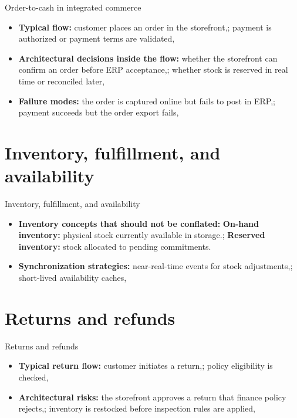\documentclass[aspectratio=169]{beamer}
\begin{document}
\begin{frame}{Order-to-cash in integrated commerce}
  \begin{itemize}
    \item \textbf{Typical flow:} customer places an order in the storefront,; payment is authorized or payment terms are validated,
    \item \textbf{Architectural decisions inside the flow:} whether the storefront can confirm an order before ERP acceptance,; whether stock is reserved in real time or reconciled later,
    \item \textbf{Failure modes:} the order is captured online but fails to post in ERP,; payment succeeds but the order export fails,
  \end{itemize}
\end{frame}

\section{Inventory, fulfillment, and availability}

\begin{frame}{Inventory, fulfillment, and availability}
  \begin{itemize}
    \item \textbf{Inventory concepts that should not be conflated:} \textbf{On-hand inventory:} physical stock currently available in storage.; \textbf{Reserved inventory:} stock allocated to pending commitments.
    \item \textbf{Synchronization strategies:} near-real-time events for stock adjustments,; short-lived availability caches,
  \end{itemize}
\end{frame}

\section{Returns and refunds}

\begin{frame}{Returns and refunds}
  \begin{itemize}
    \item \textbf{Typical return flow:} customer initiates a return,; policy eligibility is checked,
    \item \textbf{Architectural risks:} the storefront approves a return that finance policy rejects,; inventory is restocked before inspection rules are applied,
  \end{itemize}
\end{frame}
\end{document}
